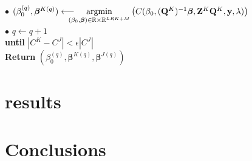 \documentclass[10pt]{article}
\begin{document}
\begin{mdframed}[leftmargin=0cm, rightmargin=4cm]
    \phantom{a}\hspace{25 pt}  $\bullet$ $(\beta_0^{(q)}, \bm{\beta}^{K {(q)}}) \longleftarrow \hspace{-10 pt} \underset{(\beta_0, \bm{\beta}) \in \mathbb{R} \times \mathbb{R}^{LRK + M}}{\text{argmin}} \left( C(\beta_0, (\mathbf{Q}^K)^{-1}\bm{\beta},\mathbf{Z}^K \mathbf{Q}^K, \mathbf{y}, \lambda) \right)$\\[2 pt]
    \phantom{a}\hspace{25 pt}  $\bullet$ $q \leftarrow q + 1$\\[4 pt]
    \phantom{a}\hspace{8 pt}  \textbf{until} $|C^K - C^J| < \epsilon |C^J| $\\[4 pt]
    \textbf{Return} $(\beta_0^{(q)},\bm{\beta}^{K(q)}, \bm{\beta}^{J(q)})$
\end{mdframed}





\vspace{10 pt}













\vspace{2 cm}

\section{results}




\section*{Conclusions}
\blindtext








\end{document}
